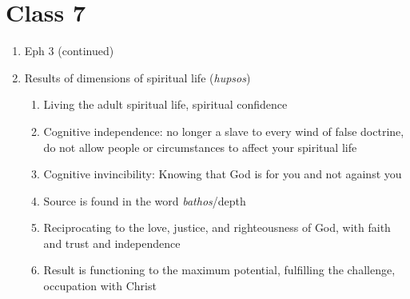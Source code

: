 \documentclass[11pt]{article}
\begin{document}
\section{Class 7}
\begin{enumerate}
	\item Eph 3 (continued)
	\item Results of dimensions of spiritual life (\emph{hupsos})
	\begin{enumerate}
		\item Living the adult spiritual life, spiritual confidence
		\item Cognitive independence: no longer a slave to every wind of false doctrine, do not allow people or circumstances to affect your spiritual life
		\item Cognitive invincibility: Knowing that God is for you and not against you
		\item Source is found in the word \emph{bathos}/depth
		\item Reciprocating to the love, justice, and righteousness of God, with faith and trust and independence
		\item Result is functioning to the maximum potential, fulfilling the challenge, occupation with Christ 
	\end{enumerate} 
	
\end{enumerate}
\end{document}
